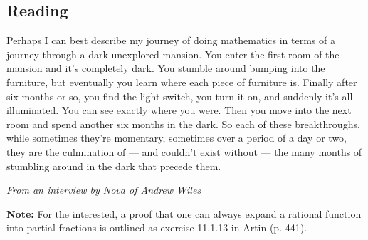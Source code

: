 


\subsection*{Reading}
Perhaps I can best describe my journey of doing mathematics in terms of a journey through a dark unexplored
mansion. You enter the first room of the mansion and it's completely dark. You stumble around bumping into
the furniture, but eventually you learn where each piece of furniture is. Finally after six months or so,
you find the light switch, you turn it on, and suddenly it's all illuminated. You can see exactly where you
were. Then you move into the next room and spend another six months in the dark. So each of these breakthroughs,
while sometimes they're momentary, sometimes over a period of a day or two, they are the culmination of --- and
couldn't exist without --- the many months of stumbling around in the dark that precede them.

\textit{From an interview by Nova of Andrew Wiles}

\textbf{Note:} For the interested, a proof that one can always expand a rational function into partial fractions
is outlined as exercise 11.1.13 in Artin (p. 441).

